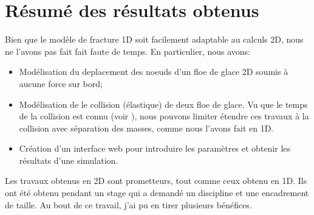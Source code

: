\section{Résumé des résultats obtenus}

Bien que le modèle de fracture 1D soit facilement adaptable au calculs 2D, nous ne l'avons pas fait fait faute de temps. En particulier, nous avons:
\begin{itemize}
    \item Modélisation du deplacement des noeuds d'un floe de glace 2D soumis à aucune force sur bord;
    \item Modélisation de le collision (élastique) de deux floe de glace. Vu que le temps de la collision est connu (voir \parencite{rabatel2015thesis}), nous pouvons limiter étendre ces travaux à la collision avec séparation des masses, comme nous l'avons fait en 1D.
    \item Création d'un interface web pour introduire les paramètres et obtenir les résultats d'une simulation. 
\end{itemize}

Les travaux obtenus en 2D sont prometteurs, tout comme ceux obtenu en 1D. Ils ont été obtenu pendant un stage qui a demandé un discipline et une encadrement de taille. Au bout de ce travail, j'ai pu en tirer plusieurs bénéfices.